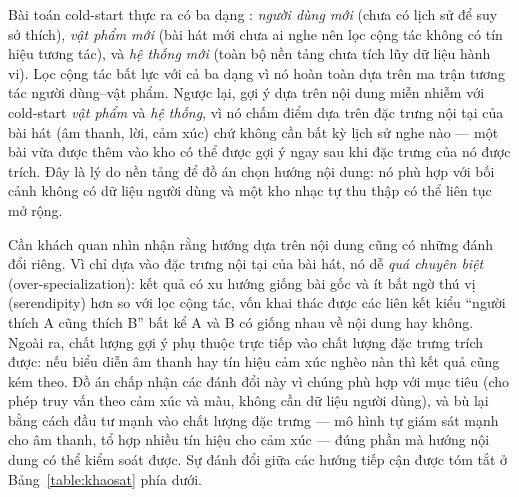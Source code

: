 \documentclass[../DoAn.tex]{subfiles}
\begin{document}
Bài toán cold-start thực ra có ba dạng \cite{schein2002coldstart}: \textit{người dùng mới} (chưa có lịch sử để suy sở thích), \textit{vật phẩm mới} (bài hát mới chưa ai nghe nên lọc cộng tác không có tín hiệu tương tác), và \textit{hệ thống mới} (toàn bộ nền tảng chưa tích lũy dữ liệu hành vi). Lọc cộng tác bất lực với cả ba dạng vì nó hoàn toàn dựa trên ma trận tương tác người dùng--vật phẩm. Ngược lại, gợi ý dựa trên nội dung miễn nhiễm với cold-start \textit{vật phẩm} và \textit{hệ thống}, vì nó chấm điểm dựa trên đặc trưng nội tại của bài hát (âm thanh, lời, cảm xúc) chứ không cần bất kỳ lịch sử nghe nào --- một bài vừa được thêm vào kho có thể được gợi ý ngay sau khi đặc trưng của nó được trích. Đây là lý do nền tảng để đồ án chọn hướng nội dung: nó phù hợp với bối cảnh không có dữ liệu người dùng và một kho nhạc tự thu thập có thể liên tục mở rộng.

Cần khách quan nhìn nhận rằng hướng dựa trên nội dung cũng có những đánh đổi riêng. Vì chỉ dựa vào đặc trưng nội tại của bài hát, nó dễ \textit{quá chuyên biệt} (over-specialization): kết quả có xu hướng giống bài gốc và ít bất ngờ thú vị (serendipity) hơn so với lọc cộng tác, vốn khai thác được các liên kết kiểu ``người thích A cũng thích B'' bất kể A và B có giống nhau về nội dung hay không. Ngoài ra, chất lượng gợi ý phụ thuộc trực tiếp vào chất lượng đặc trưng trích được: nếu biểu diễn âm thanh hay tín hiệu cảm xúc nghèo nàn thì kết quả cũng kém theo. Đồ án chấp nhận các đánh đổi này vì chúng phù hợp với mục tiêu (cho phép truy vấn theo cảm xúc và màu, không cần dữ liệu người dùng), và bù lại bằng cách đầu tư mạnh vào chất lượng đặc trưng --- mô hình tự giám sát mạnh cho âm thanh, tổ hợp nhiều tín hiệu cho cảm xúc --- đúng phần mà hướng nội dung có thể kiểm soát được. Sự đánh đổi giữa các hướng tiếp cận được tóm tắt ở Bảng~\ref{table:khaosat} phía dưới.
\end{document}
